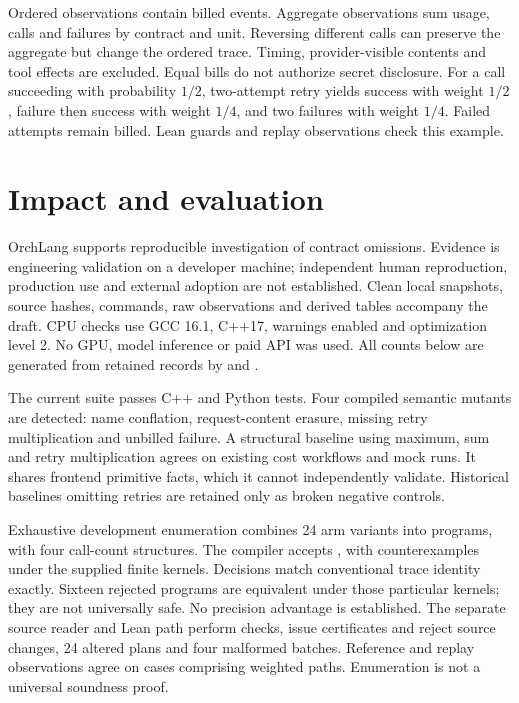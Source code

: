 \documentclass[preprint,12pt,a4paper]{elsarticle}
\begin{document}
Ordered observations contain billed events. Aggregate observations sum usage,
calls and failures by contract and unit. Reversing different calls can preserve
the aggregate but change the ordered trace. Timing, provider-visible contents
and tool effects are excluded. Equal bills do not authorize secret disclosure.
For a call succeeding with probability $1/2$, two-attempt retry yields success
with weight $1/2$, failure then success with weight $1/4$, and two failures with
weight $1/4$. Failed attempts remain billed. Lean guards and replay observations
check this example.

\section{Impact and evaluation}
OrchLang supports reproducible investigation of contract omissions. Evidence
is engineering validation on a developer machine; independent human reproduction,
production use and external adoption are not established. Clean local snapshots,
source hashes, commands, raw observations and derived tables accompany the
draft. CPU checks use GCC 16.1, C++17, warnings enabled and optimization level 2.
No GPU, model inference or paid API was used. All counts below are generated
from retained records by  and
.

The current suite passes \evDataflowCppTests{} C++ and \evDataflowPythonTests{} Python tests.
Four compiled semantic mutants are detected: name conflation, request-content
erasure, missing retry multiplication and unbilled failure. A structural
baseline using maximum, sum and retry multiplication agrees on \evCostWorkflows{} existing
cost workflows and \evCostRuns{} mock runs. It shares frontend primitive facts,
which it cannot independently validate. Historical baselines omitting retries
are retained only as broken negative controls.

Exhaustive development enumeration combines 24 arm variants into
\evGenerated{} programs, with four call-count structures. The compiler accepts
\evAccepted{}, with \evAcceptedFiniteCounterexamples{} counterexamples under
the supplied finite kernels. Decisions match conventional trace identity
exactly. Sixteen rejected programs are equivalent under those particular
kernels; they are not universally safe. No precision advantage is established.
The separate source reader and Lean path perform \evLeanChecks{} checks, issue
\evCertificates{} certificates and reject \evSourceTampers{} source changes,
24 altered plans and four malformed batches. Reference and replay observations
agree on \evReplayCases{} cases comprising \evReplayPaths{} weighted paths.
Enumeration is not a universal soundness proof.
\end{document}
